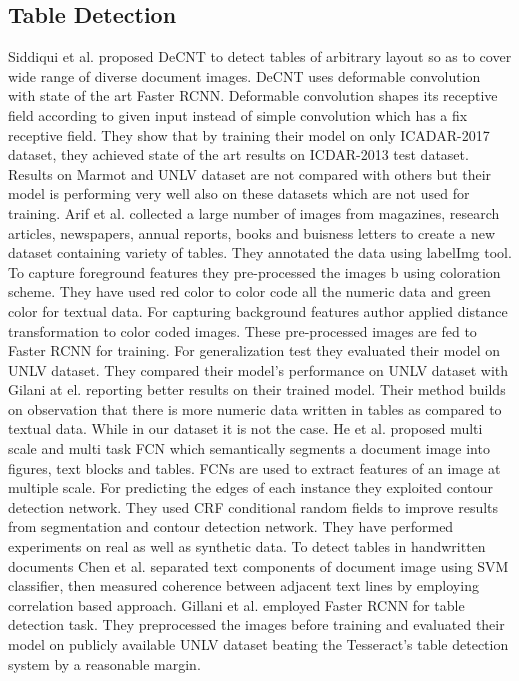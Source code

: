 \subsection{Table Detection}
\label{sec:relatedWork_Table}
Siddiqui et al. \cite{siddiqui2018decnt} proposed DeCNT to detect tables of arbitrary layout so as to cover wide range of diverse document images. DeCNT uses deformable convolution with state of the art Faster RCNN. Deformable convolution shapes its receptive field according to given input instead of simple convolution which has a fix receptive field. They show that by training their model on only ICADAR-2017 dataset, they achieved state of the art results on ICDAR-2013 test dataset. Results on Marmot and UNLV dataset are not compared with others but their model is performing very well also on these datasets which are not used for training. Arif et al. \cite{arif2018table} collected a large number of images from magazines, research articles, newspapers, annual reports, books and buisness letters to create a new dataset containing variety of tables. They annotated the data using labelImg tool. To capture foreground features they pre-processed the images b using coloration scheme. They have used red color to color code all the numeric data and green color for textual data. For capturing background features author applied distance transformation to color coded images. These pre-processed images are fed to Faster RCNN for training. For generalization test they evaluated their model on UNLV dataset. They compared their model's performance on UNLV dataset with Gilani at el. \cite{gilani2017table} reporting better results on their trained model. Their method builds on observation that there is more numeric data written in tables as compared to textual data. While in our dataset it is not the case. He et al. \cite{he2017multi} proposed multi scale and multi task FCN which semantically segments a document image into figures, text blocks and tables. FCNs are used to extract features of an image at multiple scale. For predicting the edges of each instance they exploited contour detection network. They used CRF conditional random fields to improve results from segmentation and contour detection network. They have performed experiments on real as well as synthetic data. To detect tables in handwritten documents Chen et al. \cite{chen2011table} separated text components of document image using SVM classifier, then measured coherence between adjacent text lines by employing correlation based approach. Gillani et al. \cite{gilani2017table} employed Faster RCNN for table detection task. They preprocessed the images before training and evaluated their model on publicly available UNLV dataset beating the Tesseract's table detection system by a reasonable margin.
